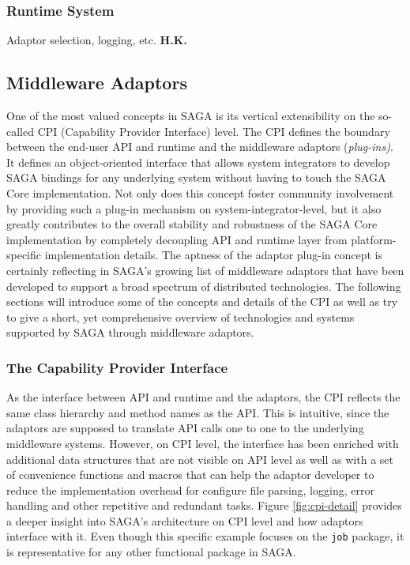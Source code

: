 \documentclass[a4paper,10pt]{article}
\begin{document}
 \subsubsection{Runtime System}
 Adaptor selection, logging, etc. \textbf{H.K.}




 \subsection{Middleware Adaptors}

 One of the most valued concepts in SAGA is its vertical extensibility on the
 so-called CPI (Capability Provider Interface) level. The CPI defines the 
 boundary between the end-user API and runtime and the middleware adaptors 
 (\textit{plug-ins)}.
 It defines an object-oriented interface that allows system integrators 
 to develop SAGA bindings for any underlying system without having to touch 
 the SAGA Core implementation. Not only does this concept foster community  
 involvement by providing such a plug-in mechanism on system-integrator-level,
 but it also greatly contributes to the overall stability and robustness of
 the SAGA Core implementation by completely decoupling API and runtime layer
 from platform-specific implementation details.
 The aptness of the adaptor plug-in concept is certainly reflecting in SAGA's 
 growing list of middleware adaptors that have been developed to support
 a broad spectrum of distributed technologies. The following sections 
 will introduce some of the concepts and details of the CPI as well as try 
 to give a short, yet comprehensive overview of technologies and systems 
 supported by SAGA through middleware adaptors.
 
 \subsubsection{The Capability Provider Interface}
 
 As the interface between API and runtime and the adaptors, the  CPI reflects the 
 same class hierarchy and method names as the API.
 This is intuitive, since the adaptors are supposed to translate API calls
 one to one to the underlying middleware systems. However, on CPI level,
 the interface has been enriched with additional data structures that are
 not visible on API level as well as with a set of convenience functions and 
 macros that can help the adaptor developer to reduce the implementation 
 overhead for configure file parsing, logging, error handling and other 
 repetitive and redundant tasks. 
 Figure \ref{fig:cpi-detail} provides a deeper insight into SAGA's architecture on CPI level 
 and how adaptors interface with it. Even though this specific example focuses on 
 the \texttt{job} package, it is representative for any other functional package
 in SAGA.
 
\end{document}
